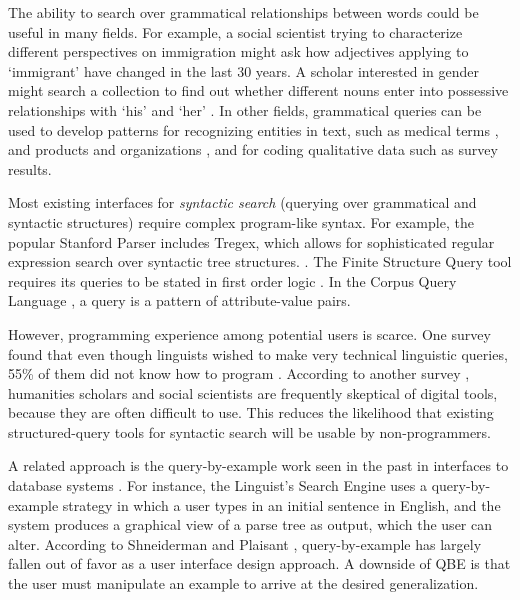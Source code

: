 The ability to search over grammatical relationships between words could be useful in many fields. For example, a social scientist trying to characterize different perspectives on immigration might ask how adjectives applying to `immigrant' have changed in the last 30 years. A scholar interested in gender might search a collection to find out whether different nouns enter into possessive relationships with `his' and `her' \cite{muralidharan2013supporting}. In other fields, grammatical queries can be used to develop patterns for recognizing entities in text, such as medical terms \cite{hirschman2005overview,maclean2013identifying}, and  products and organizations \cite{culotta2005reducing}, and for coding qualitative data such as survey results.

Most existing interfaces for \emph{syntactic search} (querying over grammatical and syntactic structures) require complex program-like syntax. For example, the popular Stanford Parser includes Tregex, which allows for sophisticated regular expression search over syntactic tree structures.
\cite{levy2006tregex}. The Finite Structure Query tool requires its queries to be stated in first order logic \cite{kepser2003finite}. In the Corpus Query Language \cite{jakubicek2010fast}, a query is a pattern of attribute-value pairs.

However, programming experience among potential users is scarce. One survey found that even though linguists wished to make very technical  linguistic queries, 55\% of them did not know how to program \cite{soehn2008requirements}. According to another survey \cite{gibbs_building_2012}, humanities scholars and social scientists are frequently skeptical of digital tools, because they are often difficult to use. This reduces the likelihood that existing structured-query tools for syntactic search will be usable by non-programmers.

A related approach is the query-by-example work seen in the past in interfaces to database systems \cite{androutsopoulos1995natural}. For instance, the Linguist's Search Engine \cite{resnik2005web} uses a query-by-example strategy in which a user types in an initial sentence in English, and the system produces a graphical view of a parse tree as output, which the user can alter. %
According to Shneiderman and Plaisant \cite{shneiderman2010designing}, query-by-example has largely fallen out of favor as a user interface design approach. A downside of QBE is that the user must manipulate an example to arrive at the desired generalization.

